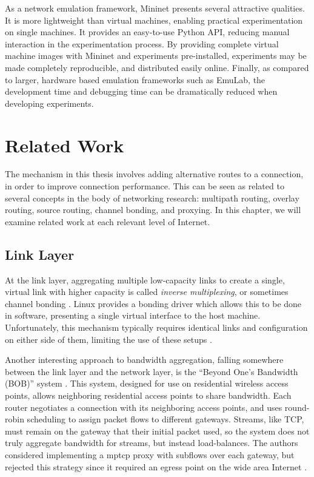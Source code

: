 \documentclass{cwru}
\begin{document}
As a network emulation framework, Mininet presents several attractive qualities.
It is more lightweight than virtual machines, enabling practical experimentation
on single machines. It provides an easy-to-use Python API, reducing manual
interaction in the experimentation process. By providing complete virtual
machine images with Mininet and experiments pre-installed, experiments may be
made completely reproducible, and distributed easily online. Finally, as
compared to larger, hardware based emulation frameworks such as EmuLab, the
development time and debugging time can be dramatically reduced when developing
experiments.

\chapter{Related Work}
\label{c:rw}

The mechanism in this thesis involves adding alternative routes to a connection,
in order to improve connection performance. This can be seen as related to
several concepts in the body of networking research: multipath routing, overlay
routing, source routing, channel bonding, and proxying. In this chapter, we will
examine related work at each relevant level of Internet.

\section{Link Layer}
\label{s:rw-ll}

At the link layer, aggregating multiple low-capacity links to create a single,
virtual link with higher capacity is called \emph{inverse multiplexing}, or
sometimes channel bonding \cite{duncanson1994inverse}. Linux provides a bonding
driver which allows this to be done in software, presenting a single virtual
interface to the host machine. Unfortunately, this mechanism typically requires
identical links and configuration on either side of them, limiting the use of
these setups \cite{chiussi1998generalized}.

Another interesting approach to bandwidth aggregation, falling somewhere between
the link layer and the network layer, is the ``Beyond One's Bandwidth (BOB)''
system \cite{radio-agg}. This system, designed for use on residential wireless
access points, allows neighboring residential access points to share bandwidth.
Each router negotiates a connection with its neighboring access points, and uses
round-robin scheduling to assign packet flows to different gateways. Streams,
like TCP, must remain on the gateway that their initial packet used, so the
system does not truly aggregate bandwidth for streams, but instead
load-balances. The authors considered implementing a \ac{mptcp} proxy with
subflows over each gateway, but rejected this strategy since it required an
egress point on the wide area Internet \cite{radio-agg}.
\end{document}

